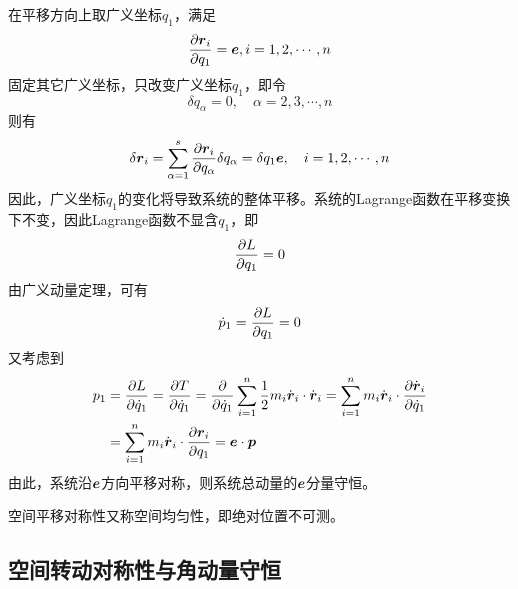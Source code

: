在平移方向上取广义坐标$q_1$，满足
\begin{equation*}
	\frac{\partial \boldsymbol{r}_i}{\partial q_1} = \boldsymbol{e},i =1,2,\cdots,n
\end{equation*}
固定其它广义坐标，只改变广义坐标$q_1$，即令
\begin{equation*}
	\delta q_\alpha = 0 ,\quad \alpha = 2,3,\cdots,n
\end{equation*}
则有
\begin{equation*}
	\delta \boldsymbol{r}_i = \sum_{\alpha=1}^s \frac{\partial \boldsymbol{r}_i}{\partial q_\alpha} \delta q_\alpha = \delta q_1 \boldsymbol{e},\quad i = 1,2,\cdots,n
\end{equation*}
因此，广义坐标$q_1$的变化将导致系统的整体平移。系统的Lagrange函数在平移变换下不变，因此Lagrange函数不显含$q_1$，即
\begin{equation*}
	\frac{\partial L}{\partial q_1} = 0
\end{equation*}
由广义动量定理，可有
\begin{equation*}
	\dot{p}_1 = \frac{\partial L}{\partial q_1} = 0
\end{equation*}
又考虑到
\begin{align*}
	p_1 & = \frac{\partial L}{\partial \dot{q}_1} = \frac{\partial T}{\partial \dot{q}_1} = \frac{\partial}{\partial \dot{q}_1} \sum_{i=1}^n \frac12 m_i \dot{\boldsymbol{r}}_i \cdot \dot{\boldsymbol{r}}_i = \sum_{i=1}^n m_i \dot{\boldsymbol{r}}_i \cdot \frac{\partial \dot{\boldsymbol{r}}_i}{\partial \dot{q}_1} \\
	& = \sum_{i=1}^n m_i \dot{\boldsymbol{r}}_i \cdot \frac{\partial \boldsymbol{r}_i}{\partial q_1} = \boldsymbol{e} \cdot \boldsymbol{p}
\end{align*}
由此，系统沿$\boldsymbol{e}$方向平移对称，则系统总动量的$\boldsymbol{e}$分量守恒。

空间平移对称性又称{\heiti 空间均匀性}，即绝对位置不可测。

\subsection{空间转动对称性与角动量守恒}

